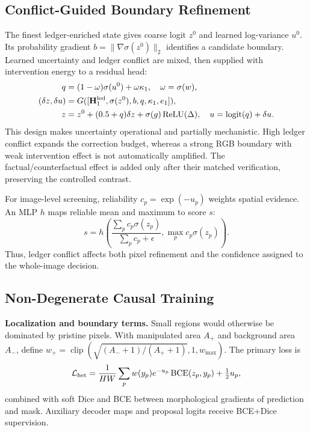 \subsection{Conflict-Guided Boundary Refinement}
\label{sec:cbr}

The finest ledger-enriched state gives coarse logit $z^0$ and learned log-variance
$u^0$. Its probability gradient $b=\|\nabla\sigma(z^0)\|_2$ identifies a candidate
boundary. Learned uncertainty and ledger conflict are mixed, then supplied with
intervention energy to a residual head:
\begin{equation}
\begin{split}
q&=(1-\omega)\sigma(u^0)+\omega\kappa_1,
\quad \omega=\sigma(w),\\
(\delta z,\delta u)&=G([\mathbf H_1^{\rm led},\sigma(z^0),b,q,
\kappa_1,e_1]),\\
z&=z^0+(0.5+q)\delta z+\sigma(g)\operatorname{ReLU}(\Delta),
\quad u=\operatorname{logit}(q)+\delta u.
\end{split}
\label{eq:new_refine}
\end{equation}
This design makes uncertainty operational and partially mechanistic. High ledger
conflict expands the correction budget, whereas a strong RGB boundary with weak
intervention effect is not automatically amplified. The factual/counterfactual
effect is added only after their matched verification, preserving the controlled
contrast.

For image-level screening, reliability $c_p=\exp(-u_p)$ weights spatial evidence.
An MLP $h$ maps reliable mean and maximum to score $s$:
\begin{equation}
s=h\!\left(\frac{\sum_p c_p\sigma(z_p)}{\sum_p c_p+\epsilon},
\max_p c_p\sigma(z_p)\right).
\label{eq:new_image_score}
\end{equation}
Thus, ledger conflict affects both pixel refinement and the confidence assigned to
the whole-image decision.

\subsection{Non-Degenerate Causal Training}
\label{sec:loss}

\textbf{Localization and boundary terms.}
Small regions would otherwise be dominated by pristine pixels. With manipulated
area $A_+$ and background area $A_-$, define
$w_+=\operatorname{clip}(\sqrt{(A_-+1)/(A_++1)},1,w_{\max})$. The primary loss is
\begin{equation}
\mathcal L_{\rm het}=\frac1{HW}\sum_p w(y_p)e^{-u_p}
\operatorname{BCE}(z_p,y_p)+\tfrac12u_p,
\label{eq:new_hetero}
\end{equation}
combined with soft Dice and BCE between morphological gradients of prediction and
mask. Auxiliary decoder maps and proposal logits receive BCE+Dice supervision.

